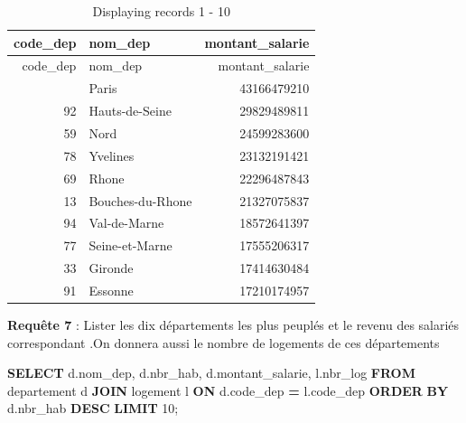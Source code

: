 \documentclass[mstat,12pt]{unswthesis}
\newenvironment{Shaded}{\begin{snugshade}}{\end{snugshade}}
\newcommand{\DecValTok}[1]{\textcolor[rgb]{0.00,0.00,0.81}{#1}}
\newcommand{\KeywordTok}[1]{\textcolor[rgb]{0.13,0.29,0.53}{\textbf{#1}}}
\newcommand{\NormalTok}[1]{#1}
\newcommand{\OperatorTok}[1]{\textcolor[rgb]{0.81,0.36,0.00}{\textbf{#1}}}
\begin{document}
\begin{longtable}[]{@{}rlr@{}}
\caption{Displaying records 1 - 10}\tabularnewline
\toprule\noalign{}
code\_dep & nom\_dep & montant\_salarie \\
\midrule\noalign{}
\endfirsthead
\toprule\noalign{}
code\_dep & nom\_dep & montant\_salarie \\
\midrule\noalign{}
\endhead
\bottomrule\noalign{}
\endlastfoot
75 & Paris & 43166479210 \\
92 & Hauts-de-Seine & 29829489811 \\
59 & Nord & 24599283600 \\
78 & Yvelines & 23132191421 \\
69 & Rhone & 22296487843 \\
13 & Bouches-du-Rhone & 21327075837 \\
94 & Val-de-Marne & 18572641397 \\
77 & Seine-et-Marne & 17555206317 \\
33 & Gironde & 17414630484 \\
91 & Essonne & 17210174957 \\
\end{longtable}

\medskip

\textbf{Requête 7} : Lister les dix départements les plus peuplés et le
revenu des salariés correspondant .On donnera aussi le nombre de
logements de ces départements

\begin{Shaded}
\begin{Highlighting}[]
\KeywordTok{SELECT}\NormalTok{ d.nom\_dep, d.nbr\_hab, d.montant\_salarie, l.nbr\_log}
\KeywordTok{FROM}\NormalTok{ departement d}
\KeywordTok{JOIN}\NormalTok{ logement l }\KeywordTok{ON}\NormalTok{ d.code\_dep }\OperatorTok{=}\NormalTok{ l.code\_dep}
\KeywordTok{ORDER} \KeywordTok{BY}\NormalTok{ d.nbr\_hab }\KeywordTok{DESC}
\KeywordTok{LIMIT} \DecValTok{10}\NormalTok{;}
\end{Highlighting}
\end{Shaded}
\end{document}
